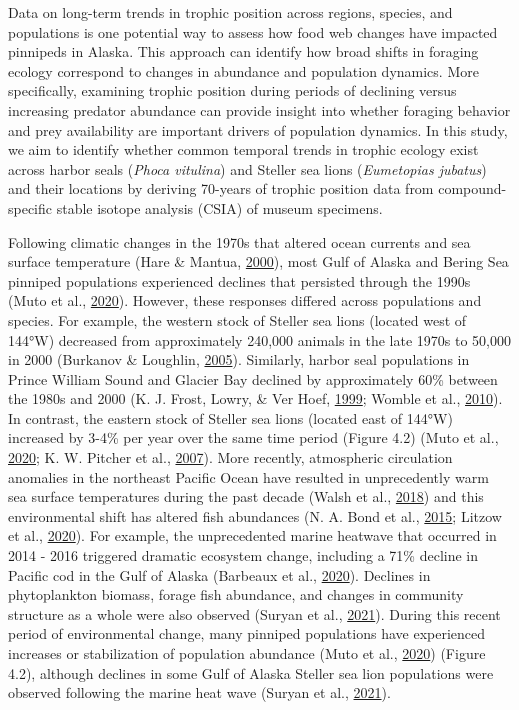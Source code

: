 \documentclass [11pt, proquest] {uwthesis}[2015/03/03]
\begin{document}
Data on long-term trends in trophic position across regions, species,
and populations is one potential way to assess how food web changes have
impacted pinnipeds in Alaska. This approach can identify how broad
shifts in foraging ecology correspond to changes in abundance and
population dynamics. More specifically, examining trophic position
during periods of declining versus increasing predator abundance can
provide insight into whether foraging behavior and prey availability are
important drivers of population dynamics. In this study, we aim to
identify whether common temporal trends in trophic ecology exist across
harbor seals (\emph{Phoca vitulina}) and Steller sea lions
(\emph{Eumetopias jubatus}) and their locations by deriving 70-years of
trophic position data from compound-specific stable isotope analysis
(CSIA) of museum specimens.

Following climatic changes in the 1970s that altered ocean currents and
sea surface temperature (Hare \& Mantua,
\protect\hyperlink{ref-Hare2000}{2000}), most Gulf of Alaska and Bering
Sea pinniped populations experienced declines that persisted through the
1990s (Muto et al., \protect\hyperlink{ref-Muto2020}{2020}). However,
these responses differed across populations and species. For example,
the western stock of Steller sea lions (located west of 144°W) decreased
from approximately 240,000 animals in the late 1970s to 50,000 in 2000
(Burkanov \& Loughlin, \protect\hyperlink{ref-Burkanov2005}{2005}).
Similarly, harbor seal populations in Prince William Sound and Glacier
Bay declined by approximately 60\% between the 1980s and 2000 (K. J.
Frost, Lowry, \& Ver Hoef, \protect\hyperlink{ref-Frost1999}{1999};
Womble et al., \protect\hyperlink{ref-Womble2010}{2010}). In contrast,
the eastern stock of Steller sea lions (located east of 144°W) increased
by 3-4\% per year over the same time period (Figure 4.2) (Muto et al.,
\protect\hyperlink{ref-Muto2020}{2020}; K. W. Pitcher et al.,
\protect\hyperlink{ref-Pitcher2007}{2007}). More recently, atmospheric
circulation anomalies in the northeast Pacific Ocean have resulted in
unprecedently warm sea surface temperatures during the past decade
(Walsh et al., \protect\hyperlink{ref-Walsh2018}{2018}) and this
environmental shift has altered fish abundances (N. A. Bond et al.,
\protect\hyperlink{ref-Bond2015}{2015}; Litzow et al.,
\protect\hyperlink{ref-Litzow2020}{2020}). For example, the
unprecedented marine heatwave that occurred in 2014 - 2016 triggered
dramatic ecosystem change, including a 71\% decline in Pacific cod in
the Gulf of Alaska (Barbeaux et al.,
\protect\hyperlink{ref-Barbeaux2020}{2020}). Declines in phytoplankton
biomass, forage fish abundance, and changes in community structure as a
whole were also observed (Suryan et al.,
\protect\hyperlink{ref-Suryan2021}{2021}). During this recent period of
environmental change, many pinniped populations have experienced
increases or stabilization of population abundance (Muto et al.,
\protect\hyperlink{ref-Muto2020}{2020}) (Figure 4.2), although declines
in some Gulf of Alaska Steller sea lion populations were observed
following the marine heat wave (Suryan et al.,
\protect\hyperlink{ref-Suryan2021}{2021}).
\end{document}
